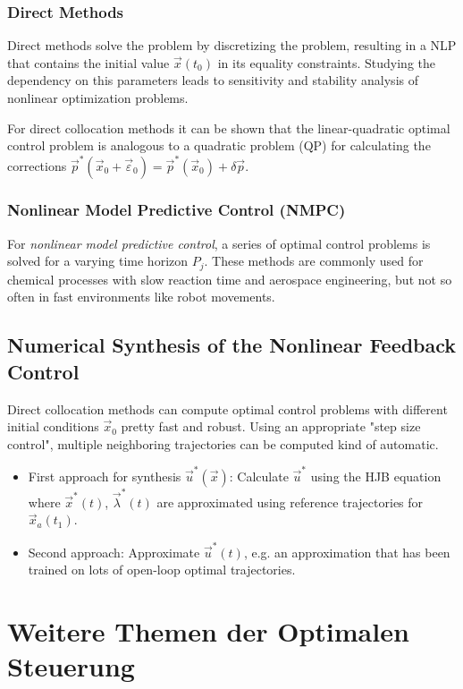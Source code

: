 		\subsection{Direct Methods}
			Direct methods solve the problem by discretizing the problem, resulting in a NLP that contains the initial value \( \vec{x}(t_0) \) in its equality constraints. Studying the dependency on this parameters leads to sensitivity and stability analysis of nonlinear optimization problems.

			For direct collocation methods it can be shown that the linear-quadratic optimal control problem is analogous to a quadratic problem (QP) for calculating the corrections \( \vec{p}^\ast(\vec{x}_0 + \vec{\varepsilon}_0) = \vec{p}^\ast(\vec{x}_0) + \delta\vec{p} \).

		\subsection{Nonlinear Model Predictive Control (NMPC)}
			For \emph{nonlinear model predictive control}, a series of optimal control problems is solved for a varying time horizon \(P_j\). These methods are commonly used for chemical processes with slow reaction time and aerospace engineering, but not so often in fast environments like robot movements.

	\section{Numerical Synthesis of the Nonlinear Feedback Control}
		Direct collocation methods can compute optimal control problems with different initial conditions \( \vec{x}_0 \) pretty fast and robust. Using an appropriate "step size control", multiple neighboring trajectories can be computed kind of automatic.
		\begin{itemize}
			\item First approach for synthesis \( \vec{u}^\ast(\vec{x}) \): Calculate \( \vec{u}^\ast \) using the HJB equation where \( \vec{x}^\ast(t) \), \( \vec{\lambda}^\ast(t) \) are approximated using reference trajectories for \( \vec{x}_a(t_1) \).
			\item Second approach: Approximate \( \vec{u}^\ast(t) \), e.g. an approximation that has been trained on lots of open-loop optimal trajectories.
		\end{itemize}

\chapter{Weitere Themen der Optimalen Steuerung} %

